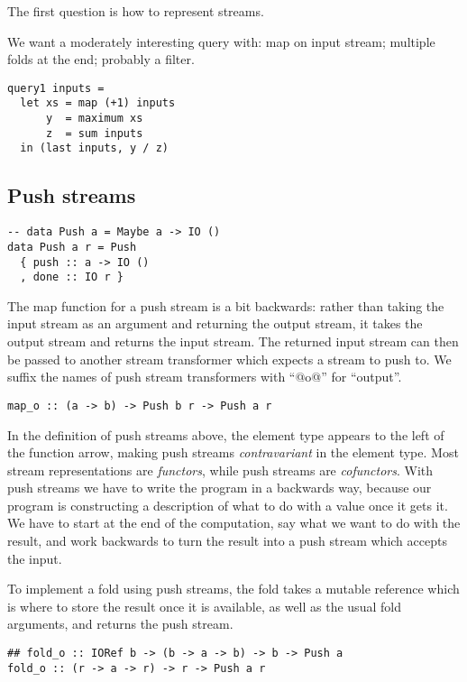 The first question is how to represent streams.

We want a moderately interesting query with: map on input stream; multiple folds at the end; probably a filter.

\begin{lstlisting}
query1 inputs =
  let xs = map (+1) inputs
      y  = maximum xs
      z  = sum inputs
  in (last inputs, y / z)
\end{lstlisting}

\subsection{Push streams}


\begin{lstlisting}
-- data Push a = Maybe a -> IO ()
data Push a r = Push
  { push :: a -> IO ()
  , done :: IO r }
\end{lstlisting}

The map function for a push stream is a bit backwards: rather than taking the input stream as an argument and returning the output stream, it takes the output stream and returns the input stream.
The returned input stream can then be passed to another stream transformer which expects a stream to push to.
We suffix the names of push stream transformers with ``@o@'' for ``output''.

\begin{lstlisting}
map_o :: (a -> b) -> Push b r -> Push a r
\end{lstlisting}

In the definition of push streams above, the element type appears to the left of the function arrow, making push streams \emph{contravariant} in the element type.
Most stream representations are \emph{functors}, while push streams are \emph{cofunctors}.
With push streams we have to write the program in a backwards way, because our program is constructing a description of what to do with a value once it gets it.
We have to start at the end of the computation, say what we want to do with the result, and work backwards to turn the result into a push stream which accepts the input.

To implement a fold using push streams, the fold takes a mutable reference which is where to store the result once it is available, as well as the usual fold arguments, and returns the push stream.

\begin{lstlisting}
## fold_o :: IORef b -> (b -> a -> b) -> b -> Push a
fold_o :: (r -> a -> r) -> r -> Push a r
\end{lstlisting}

